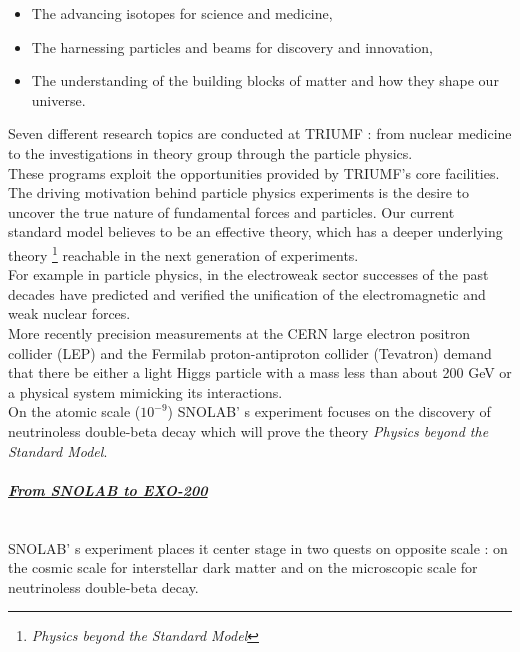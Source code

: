 \documentclass[a4paper, 11pt]{report}%
\newcommand{\TR}{TRIUMF }
\begin{document}
  \begin{itemize}
  \item The advancing isotopes for science and medicine,  
  \item The harnessing particles and beams for discovery and innovation,   
  \item The understanding of the building blocks of matter and how they shape our universe. 
  \end{itemize}

  Seven different research topics are conducted at \TR: from nuclear medicine to the investigations in theory group 
  through the particle physics. 
  \\
  
  These programs exploit the opportunities provided by TRIUMF's core facilities.\\
  The driving motivation behind particle physics experiments is the desire to uncover the true nature of fundamental forces and particles. 
  Our current standard model \cite{ref:modern_particle_physics} believes to be an effective theory, which has a deeper underlying theory 
  \footnote{\textit{Physics beyond the Standard Model}} reachable in the next generation of experiments.
  \\
  
  For example in particle physics, in the electroweak sector \cite{ref:modern_particle_physics} successes of the past 
  decades have predicted and verified the unification of the electromagnetic and weak nuclear forces.\\
  More recently precision measurements at the CERN large electron positron collider (LEP) 
  and the Fermilab proton-antiproton collider (Tevatron) demand that there be either a light Higgs particle with a mass less 
  than about 200 GeV or a physical system mimicking its interactions. 
  \\
  
  On the atomic scale ($10^{-9}$) SNOLAB' s experiment focuses on the discovery of neutrinoless double-beta decay which will prove the theory 
  \textit{Physics beyond the Standard Model}.
  
  \paragraph{\underline{\textit{From SNOLAB to EXO-200}}}
  \leavevmode
  \\
  
  SNOLAB' s experiment places it center stage in two quests on opposite scale : on the cosmic scale for interstellar dark matter and on the 
  microscopic scale for neutrinoless double-beta decay. 
  \\
  
\end{document}
